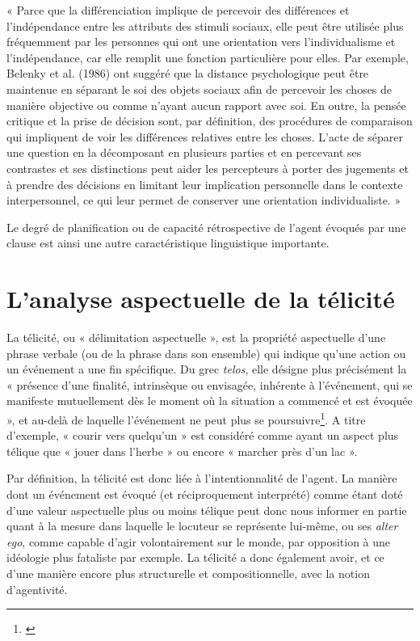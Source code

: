\begin{displayquote}
 « Parce que la différenciation implique de percevoir des différences et l'indépendance entre les attributs des stimuli sociaux, elle peut être utilisée plus fréquemment par les personnes qui ont une orientation vers l'individualisme et l'indépendance, car elle remplit une fonction particulière pour elles. Par exemple, Belenky et al. (1986) ont suggéré que la distance psychologique peut être maintenue en séparant le soi des objets sociaux afin de percevoir les choses de manière objective ou comme n'ayant aucun rapport avec soi. En outre, la pensée critique et la prise de décision sont, par définition, des procédures de comparaison qui impliquent de voir les différences relatives entre les choses. L'acte de séparer une question en la décomposant en plusieurs parties et en percevant ses contrastes et ses distinctions peut aider les percepteurs à porter des jugements et à prendre des décisions en limitant leur implication personnelle dans le contexte interpersonnel, ce qui leur permet de conserver une orientation individualiste. »
\end{displayquote}

Le degré de planification ou de capacité rétrospective de l'agent évoqués par une clause est ainsi une autre caractéristique linguistique importante.

\section{L’analyse aspectuelle de la télicité}

La télicité, ou « délimitation aspectuelle », est la propriété aspectuelle d'une phrase verbale (ou de la phrase dans son ensemble) qui indique qu'une action ou un événement a une fin spécifique. Du grec \textit{telos}, elle désigne plus précisément la « présence d'une finalité, intrinsèque ou envisagée, inhérente à l'événement, qui se manifeste mutuellement dès le moment où la situation a commencé et est évoquée », et au-delà de laquelle l'événement ne peut plus se poursuivre\footnote{\cite{depraetere_telicity_2007}}. A titre d’exemple, « courir vers quelqu'un » est considéré comme ayant un aspect plus télique que « jouer dans l'herbe » ou encore « marcher près d'un lac ».

Par définition, la télicité est donc liée à l'intentionnalité de l'agent. La manière dont un événement est évoqué (et réciproquement interprété) comme étant doté d'une valeur aspectuelle plus ou moins télique peut donc nous informer en partie quant à la mesure dans laquelle le locuteur se représente lui-même, ou ses \textit{alter ego}, comme capable d'agir volontairement sur le monde, par opposition à une idéologie plus fataliste par exemple. La télicité a donc également avoir, et ce d'une manière encore plus structurelle et compositionnelle, avec la notion d’agentivité. 

